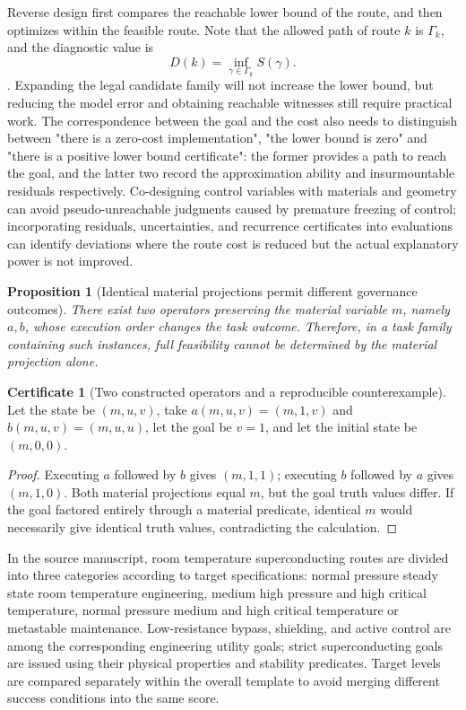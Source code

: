 \documentclass[11pt,a4paper]{article}
\theoremstyle{plain}
\newtheorem{proposition}[theorem]{Proposition}
\theoremstyle{definition}
\newtheorem*{certificate}{Certificate}
\theoremstyle{remark}
\begin{document}
\begin{CJK*}
Reverse design first compares the reachable lower bound of the route, and then optimizes within the feasible route. Note that the allowed path of route $k$ is $\Gamma_k$, and the diagnostic value is \[
 D(k)=\inf_{\gamma\in\Gamma_k}S(\gamma).
\]. Expanding the legal candidate family will not increase the lower bound, but reducing the model error and obtaining reachable witnesses still require practical work. The correspondence between the goal and the cost also needs to distinguish between "there is a zero-cost implementation", "the lower bound is zero" and "there is a positive lower bound certificate": the former provides a path to reach the goal, and the latter two record the approximation ability and insurmountable residuals respectively. Co-designing control variables with materials and geometry can avoid pseudo-unreachable judgments caused by premature freezing of control; incorporating residuals, uncertainties, and recurrence certificates into evaluations can identify deviations where the route cost is reduced but the actual explanatory power is not improved. \cite{S13}

\begin{proposition} [Identical material projections permit different governance outcomes]
\label{fa:prop-material}
There exist two operators preserving the material variable $m$, namely $a,b$, whose execution order changes the task outcome. Therefore, in a task family containing such instances, full feasibility cannot be determined by the material projection alone.
\end{proposition}
\begin{certificate} [Two constructed operators and a reproducible counterexample]
Let the state be $(m,u,v)$, take $a(m,u,v)=(m,1,v)$ and $b(m,u,v)=(m,u,u)$, let the goal be $v=1$, and let the initial state be $(m,0,0)$.
\end{certificate}
\begin{proof}
Executing $a$ followed by $b$ gives $(m,1,1)$; executing $b$ followed by $a$ gives $(m,1,0)$. Both material projections equal $m$, but the goal truth values differ. If the goal factored entirely through a material predicate, identical $m$ would necessarily give identical truth values, contradicting the calculation.
\end{proof}

In the source manuscript, room temperature superconducting routes are divided into three categories according to target specifications: normal pressure steady state room temperature engineering, medium high pressure and high critical temperature, normal pressure medium and high critical temperature or metastable maintenance. Low-resistance bypass, shielding, and active control are among the corresponding engineering utility goals; strict superconducting goals are issued using their physical properties and stability predicates. Target levels are compared separately within the overall template to avoid merging different success conditions into the same score.


\end{CJK*}
\end{document}
